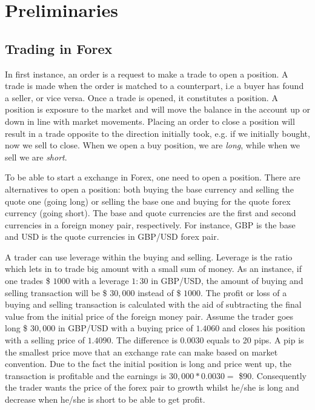 \section{Preliminaries}
\label{sec:3}

\subsection{Trading in Forex}
In first instance, an order is a request to make a trade to open a position.
A trade is made when the order is matched to a counterpart, i.e a buyer has found a seller, or vice versa.
Once a trade is opened, it constitutes a position. A position is exposure to the market and will move the balance in the account up or down in line with market movements. Placing an order to close a position will result in a trade opposite to the direction initially took, e.g. if we initially bought, now we sell to close. When we open a buy position, we are \textit{long}, while when we sell we are \textit{short}.

To be able to start a exchange in Forex, one need to open a position. There are alternatives to open a position: both buying the base currency and selling the quote one (going long) or selling the base one and buying for the quote forex currency (going short). The base and quote currencies are the first and second currencies in a foreign money pair, respectively. For instance, GBP is the base and USD is the quote currencies in GBP/USD forex pair.

A trader can use leverage within the buying and selling. Leverage is the ratio which lets in to trade big amount with a small sum of money. As an instance, if one trades \$ $1000$ with a leverage $1:30$ in GBP/USD, the amount of buying and selling transaction will be \$ $30,000$ instead of \$ $1000$.
The profit or loss of a buying and selling transaction is calculated with the aid of subtracting the final value from the initial price of the foreign money pair. Assume the trader goes long  \$ $30,000$ in GBP/USD with a buying price of $1.4060$ and closes his position with a selling price of $1.4090$. The difference is $0.0030$ equals to 20 pips. A pip is the smallest price move that an exchange rate can make based on market convention. Due to the fact the initial position is long and price went up, the transaction is profitable and the earnings is $30,000 * 0.0030 =$ \$90. Consequently the trader wants the price of the forex pair to growth whilst he/she is long and decrease when he/she is short to be able to get profit.

